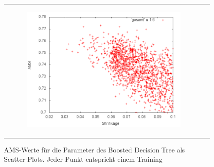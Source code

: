 \begin{figure}[!t]
\begin{tabular}[b]{cc}
  	  \begin{subfigure}[b]{0.5\linewidth}
	   	\includegraphics[width=\linewidth]{sections/parameter_optimization_bdt/Shrinkage.png}
 		\caption[]{}
		\label{fig:bdt_Shrinkage}
  	  \end{subfigure} &
  \end{tabular}
  \caption[]{AMS-Werte für die Parameter des Boosted Decision Tree als Scatter-Plots. Jeder Punkt entspricht einem Training}
  \label{AMS-distribution-plots}
\end{figure}